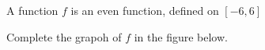 \documentclass{ximera}
\author{Tom Dinitz and Nela Lakos}
\begin{document}
\begin{exercise}

A function $f$ is an even function, defined on $[-6,6]$

Complete the grapoh of $f$ in the figure below.
\end{exercise}
\end{document}
